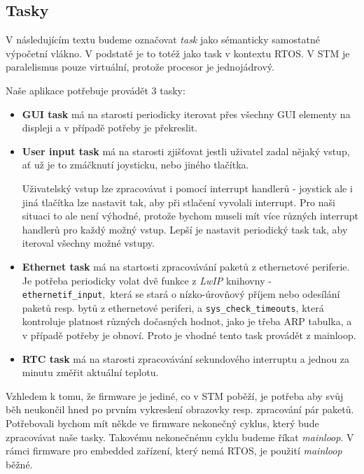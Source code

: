 \subsection{Tasky}

V následujícím textu budeme označovat \emph{task} jako sémanticky samostatné výpočetní
vlákno.
V podstatě je to totéž jako task v kontextu RTOS.
V STM je paralelismus pouze virtuální, protože procesor je jednojádrový.

Naše aplikace potřebuje provádět 3 tasky:
\begin{itemize}
  \item \textbf{GUI task} má na starosti periodicky iterovat přes všechny GUI elementy
    na displeji a v případě potřeby je překreslit.

  \item \textbf{User input task} má na starosti zjišťovat jestli uživatel zadal nějaký
    vstup, ať už je to zmáčknutí joysticku, nebo jiného tlačítka.

    Uživatelský vstup lze zpracovávat i pomocí interrupt handlerů - joystick
    ale i jiná tlačítka lze nastavit tak, aby při stlačení vyvolali interrupt.
    Pro naši situaci to ale není výhodné, protože bychom museli mít více různých
    interrupt handlerů pro každý možný vstup.
    Lepší je nastavit periodický task tak, aby iteroval všechny možné vstupy.

  \item \textbf{Ethernet task} má na startosti zpracovávání paketů z ethernetové
    periferie. Je potřeba periodicky volat dvě funkce z \textit{LwIP} knihovny -
    \texttt{ethernetif\_input},~která se stará o nízko-úrovňový příjem nebo odesílání paketů resp.
    bytů z ethernetové periferi, a \texttt{sys\_check\_timeouts}, která kontroluje platnost různých
    dočasných hodnot, jako je třeba ARP tabulka, a v případě potřeby je obnoví.
    Proto je vhodné tento task provádět z mainloop.

  \item \textbf{RTC task} má na starosti zpracovávání sekundového interruptu a jednou za
    minutu změřit aktuální teplotu.
\end{itemize}

Vzhledem k tomu, že firmware je jediné, co v STM poběží, je potřeba aby svůj běh neukončil
hned po prvním vykreslení obrazovky resp. zpracování pár paketů.
Potřebovali bychom mít někde ve firmware nekonečný cyklus, který bude zpracovávat naše
tasky.
Takovému nekonečnému cyklu budeme říkat \emph{mainloop}.
V rámci firmware pro embedded zařízení, který nemá RTOS, je použití \emph{mainloop} běžné.

